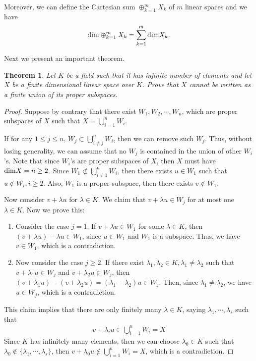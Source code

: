 \documentclass[11pt]{book}
\newtheorem{theorem}{Theorem}[section]
\theoremstyle{definition}
\numberwithin{equation}{subsection}
\begin{document}
Moreover, we can define the Cartesian sum $\oplus^m_{k=1}X_k$ of $m$ linear spaces and we have 
\begin{align*}
    {\rm dim}\oplus^m_{k=1}X_k = \sum^m_{k=1}{\rm dim}X_k.
\end{align*}

\medskip

Next we present an important theorem.

\begin{theorem}
Let $K$ be a field such that it has infinite number of elements and let $X$ be a finite dimensional linear space over $K$. Prove that $X$ cannot be written as a finite union of its proper subspaces.
\end{theorem}
\begin{proof}
Suppose by contrary that there exist $W_1, W_2,\cdots, W_n$, which are proper subspaces of $X$ such that $X = \bigcup^n_{i=1}W_i$. 

If for any $1\leq j\leq n$, $W_j\subset \bigcup^n_{i\neq j}W_i$, then we can remove such $W_j$. Thus, without losing generality, we can assume that no $W_j$ is contained in the union of other $W_i$'s. Note that since $W_i$'s are proper subspaces of $X$, then $X$ must have ${\rm dim}X = n \geq 2$. Since $W_1\not\subset \bigcup^n_{i\neq 1}W_i$, then there exists $u\in W_1$ such that $u\notin W_i, i\geq 2$. Also, $W_1$ is a proper subspace, then there exists $v\notin W_1$. 

Now consider $v + \lambda u$ for $\lambda\in K$. We claim that $v + \lambda u\in W_j$ for at most one $\lambda\in K$. Now we prove this:
\begin{enumerate}[label=(\arabic*)]
    \item Consider the case $j=1$. If $v + \lambda u\in W_1$ for some $\lambda\in K$, then $(v + \lambda u) - \lambda u\in W_1$, since $u\in W_1$ and $W_1$ is a subspace. Thus, we have $v\in W_1$, which is a contradiction.
    \item Now consider the case $j\geq 2$. If there exist $\lambda_1, \lambda_2\in K, \lambda_1\neq\lambda_2$ such that $v+\lambda_1 u\in W_j$ and $v+\lambda_2 u\in W_j$, then $(v+\lambda_1 u) - (v+\lambda_2 u) = (\lambda_1 - \lambda_2)u \in W_j$. Then, since $\lambda_1\neq\lambda_2$, we have $u\in W_j$, which is a contradiction.
\end{enumerate}

This claim implies that there are only finitely many $\lambda\in K$, saying $\lambda_1, \cdots, \lambda_s$ such that 
\begin{align*}
    v+\lambda_i u \in \bigcup^n_{i=1}W_i = X
\end{align*}
Since $K$ has infinitely many elements, then we can choose $\lambda_0\in K$ such that $\lambda_0\notin \{\lambda_1, \cdots, \lambda_s\}$, then $v+\lambda_0 u\notin \bigcup^n_{i=1}W_i = X$, which is a contradiction.
\end{proof}
\end{document}
